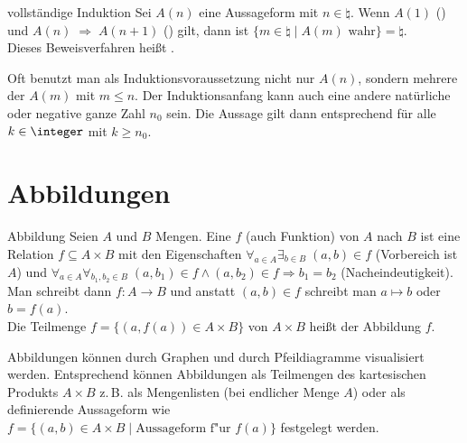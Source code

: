 \begin{Satz}{vollständige Induktion}
    Sei $A(n)$ eine Aussageform mit $n \in \natural$.
    Wenn $A(1)$ () und
    $A(n) \;\Rightarrow\; A(n + 1)$ () gilt,
    dann ist $\{m \in \natural \;|\; A(m) \text{ wahr}\} = \natural$. \\
    Dieses Beweisverfahren heißt .
\end{Satz}

\begin{Bem}
    Oft benutzt man als Induktionsvoraussetzung nicht nur $A(n)$, sondern
    mehrere der $A(m)$ mit $m \le n$.
    Der Induktionsanfang kann auch eine andere natürliche oder negative ganze
    Zahl $n_0$ sein.
    Die Aussage gilt dann entsprechend für alle $k \in \integer$ mit
    $k \ge n_0$.
\end{Bem}

\section{%
    Abbildungen%
}

\begin{Def}{Abbildung}
    Seien $A$ und $B$ Mengen.
    Eine  $f$ (auch Funktion) von $A$ nach $B$ ist eine
    Relation $f \subseteq A \times B$ mit den Eigenschaften
    $\forall_{a \in A} \exists_{b \in B}\; (a, b) \in f$ (Vorbereich ist $A$)
    und $\forall_{a \in A} \forall_{b_1, b_2 \in B}\;
    (a, b_1) \in f \land (a, b_2) \in f \Rightarrow b_1 = b_2$
    (Nacheindeutigkeit). \\
    Man schreibt dann $f: A \rightarrow B$ und anstatt $(a, b) \in f$ schreibt
    man $a \mapsto b$ oder $b = f(a)$. \\
    Die Teilmenge $f = \{(a, f(a)) \in A \times B\}$ von $A \times B$ heißt
     der Abbildung $f$.
\end{Def}

\begin{Bem}
    Abbildungen können durch Graphen und durch Pfeildiagramme visualisiert
    werden.
    Entsprechend können Abbildungen als Teilmengen des kartesischen Produkts
    $A \times B$ z.\,B. als Mengenlisten (bei endlicher Menge $A$) oder als
    definierende Aussageform wie \\
    $f = \{(a, b) \in A \times B \;|\; \text{Aussageform f"ur } f(a)\}$
    festgelegt werden.
\end{Bem}

